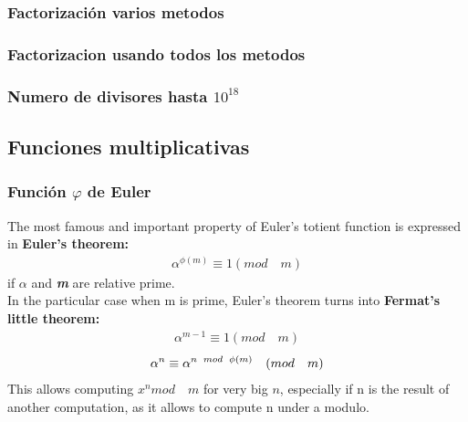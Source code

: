 			\subsubsection{Factorización varios metodos}

			\subsubsection{Factorizacion usando todos los metodos}

			\subsubsection{Numero de divisores hasta $10^{18}$}
		
			\subsection{Funciones multiplicativas}
			\subsubsection{Función $\varphi$ de Euler}
			The most famous and important property of Euler's totient function
			 is expressed in \textbf{Euler's theorem:}
			\\
			\begin{align}
				\alpha^{\phi(m)} \equiv 1 (mod  \quad m)
			\end{align}
			if \textbf{\textit{$\alpha$}}
			and \textbf{\textit{m}} 
			are relative prime.\\
			In the particular case when m is prime,
			Euler's theorem turns into \textbf{Fermat's little theorem:}
			\begin{align}
				\alpha^{m-1}\equiv 1 (mod  \quad m)
			\end{align}
			\smallskip
			\begin{align}
				\alpha^{n}\equiv \alpha^{n \enskip mod \enskip\phi(m)} \quad (mod  \quad m)
			\end{align}
			This allows computing $x^{n} mod \quad m$ for very big $n$, especially if
			n is the result of another computation, 
			as it allows to compute n under a modulo.
				
